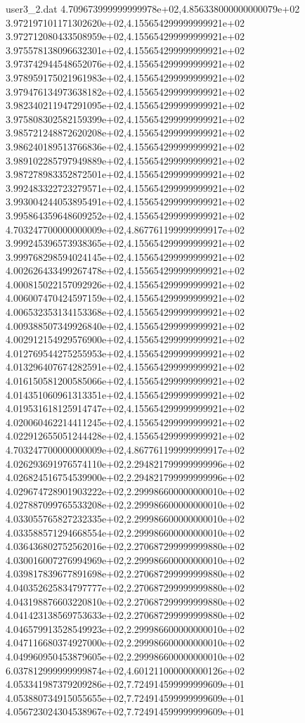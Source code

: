 \begin{filecontents}{user3_2.dat}
4.709673999999999978e+02,4.856338000000000079e+02
3.972197101171302620e+02,4.155654299999999921e+02
3.972712080433508959e+02,4.155654299999999921e+02
3.975578138096632301e+02,4.155654299999999921e+02
3.973742944548652076e+02,4.155654299999999921e+02
3.978959175021961983e+02,4.155654299999999921e+02
3.979476134973638182e+02,4.155654299999999921e+02
3.982340211947291095e+02,4.155654299999999921e+02
3.975808302582159399e+02,4.155654299999999921e+02
3.985721248872620208e+02,4.155654299999999921e+02
3.986240189513766836e+02,4.155654299999999921e+02
3.989102285797949889e+02,4.155654299999999921e+02
3.987278983352872501e+02,4.155654299999999921e+02
3.992483322723279571e+02,4.155654299999999921e+02
3.993004244053895491e+02,4.155654299999999921e+02
3.995864359648609252e+02,4.155654299999999921e+02
4.703247700000000009e+02,4.867761199999999917e+02
3.999245396573938365e+02,4.155654299999999921e+02
3.999768298594024145e+02,4.155654299999999921e+02
4.002626433499267478e+02,4.155654299999999921e+02
4.000815022157092926e+02,4.155654299999999921e+02
4.006007470424597159e+02,4.155654299999999921e+02
4.006532353134153368e+02,4.155654299999999921e+02
4.009388507349926840e+02,4.155654299999999921e+02
4.002912154929576900e+02,4.155654299999999921e+02
4.012769544275255953e+02,4.155654299999999921e+02
4.013296407674282591e+02,4.155654299999999921e+02
4.016150581200585066e+02,4.155654299999999921e+02
4.014351060961313351e+02,4.155654299999999921e+02
4.019531618125914747e+02,4.155654299999999921e+02
4.020060462214411245e+02,4.155654299999999921e+02
4.022912655051244428e+02,4.155654299999999921e+02
4.703247700000000009e+02,4.867761199999999917e+02
4.026293691976574110e+02,2.294821799999999996e+02
4.026824516754539900e+02,2.294821799999999996e+02
4.029674728901903222e+02,2.299986600000000010e+02
4.027887099765533208e+02,2.299986600000000010e+02
4.033055765827232335e+02,2.299986600000000010e+02
4.033588571294668554e+02,2.299986600000000010e+02
4.036436802752562016e+02,2.270687299999999880e+02
4.030016007276994969e+02,2.299986600000000010e+02
4.039817839677891698e+02,2.270687299999999880e+02
4.040352625834797777e+02,2.270687299999999880e+02
4.043198876603220810e+02,2.270687299999999880e+02
4.041423138569753633e+02,2.270687299999999880e+02
4.046579913528549923e+02,2.299986600000000010e+02
4.047116680374927000e+02,2.299986600000000010e+02
4.049960950453879605e+02,2.299986600000000010e+02
6.037812999999999874e+02,4.601211000000000126e+02
4.053341987379209286e+02,7.724914599999999609e+01
4.053880734915055655e+02,7.724914599999999609e+01
4.056723024304538967e+02,7.724914599999999609e+01

\end{filecontents}
